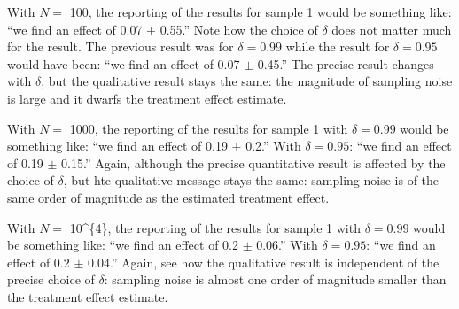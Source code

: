 \documentclass[]{book}
\newenvironment{Shaded}{\begin{snugshade}}{\end{snugshade}}
\newcommand{\KeywordTok}[1]{\textcolor[rgb]{0.13,0.29,0.53}{\textbf{#1}}}
\newcommand{\DataTypeTok}[1]{\textcolor[rgb]{0.13,0.29,0.53}{#1}}
\newcommand{\DecValTok}[1]{\textcolor[rgb]{0.00,0.00,0.81}{#1}}
\newcommand{\StringTok}[1]{\textcolor[rgb]{0.31,0.60,0.02}{#1}}
\newcommand{\ControlFlowTok}[1]{\textcolor[rgb]{0.13,0.29,0.53}{\textbf{#1}}}
\newcommand{\OperatorTok}[1]{\textcolor[rgb]{0.81,0.36,0.00}{\textbf{#1}}}
\newcommand{\NormalTok}[1]{#1}
\theoremstyle{definition}
\theoremstyle{definition}
\theoremstyle{definition}
\theoremstyle{remark}
\begin{document}
\begin{Shaded}
\end{Shaded}

With \(N=\) 100, the reporting of the results for sample 1 would be
something like: ``we find an effect of 0.07 \(\pm\) 0.55.'' Note how the
choice of \(\delta\) does not matter much for the result. The previous
result was for \(\delta=0.99\) while the result for \(\delta=0.95\)
would have been: ``we find an effect of 0.07 \(\pm\) 0.45.'' The precise
result changes with \(\delta\), but the qualitative result stays the
same: the magnitude of sampling noise is large and it dwarfs the
treatment effect estimate.

With \(N=\) 1000, the reporting of the results for sample 1 with
\(\delta=0.99\) would be something like: ``we find an effect of 0.19
\(\pm\) 0.2.'' With \(\delta=0.95\): ``we find an effect of 0.19 \(\pm\)
0.15.'' Again, although the precise quantitative result is affected by
the choice of \(\delta\), but hte qualitative message stays the same:
sampling noise is of the same order of magnitude as the estimated
treatment effect.

With \(N=\) 10\^{}\{4\}, the reporting of the results for sample 1 with
\(\delta=0.99\) would be something like: ``we find an effect of 0.2
\(\pm\) 0.06.'' With \(\delta=0.95\): ``we find an effect of 0.2 \(\pm\)
0.04.'' Again, see how the qualitative result is independent of the
precise choice of \(\delta\): sampling noise is almost one order of
magnitude smaller than the treatment effect estimate.
\end{document}

